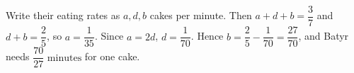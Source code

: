 Write their eating rates as $a,d,b$ cakes per minute. Then $a+d+b=\dfrac{3}{7}$ and $d+b=\dfrac{2}{5}$, so $a=\dfrac{1}{35}$. Since $a=2d$, $d=\dfrac{1}{70}$. Hence $b=\dfrac{2}{5}-\dfrac{1}{70}=\dfrac{27}{70}$, and Batyr needs $\boxed{\dfrac{70}{27}\text{ minutes}}$ for one cake.
